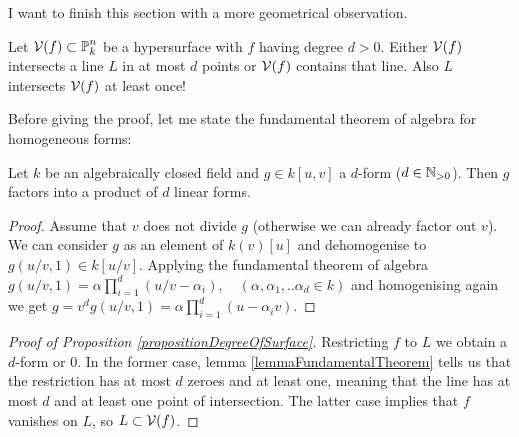 I want to finish this section with a more geometrical observation.
\begin{proposition} \label{propositionDegreeOfSurface}
Let $\operatorname{\mathcal V}(f) \subset \operatorname{\mathbb P}^n_k$ be a hypersurface with $f$ having degree $d> 0$.
Either $\operatorname{\mathcal V}(f)$ intersects a line $L$ in at most $d$ points or $\operatorname{\mathcal V}(f)$ contains that line.
Also $L$ intersects $\operatorname{\mathcal V}(f)$ at least once!
\end{proposition}

Before giving the proof, let me state the fundamental theorem of algebra for homogeneous forms:

\begin{lemma} \label{lemmaFundamentalTheorem}
Let $k$ be an algebraically closed field and $g \in k[u,v]$ a $d$-form ($d \in \operatorname{\mathbb N_{>0}}$).
Then $g$ factors into a product of $d$ linear forms.
\end{lemma}
\begin{proof}
Assume that $v$ does not divide $g$ (otherwise we can already factor out $v$).
We can consider $g$ as an element of $k(v)[u]$ and dehomogenise to $g(u/v,1) \in k[u/v]$.
Applying the fundamental theorem of algebra $g(u/v,1) = \alpha\prod_{i=1}^d(u/v - \alpha_i), \quad (\alpha,\alpha_1,..\alpha_d \in k)$ and homogenising again we get
$g = v^d g(u/v,1) = \alpha\prod_{i=1}^d(u - \alpha_iv)$.
\end{proof}

\begin{proof}[Proof of Proposition \ref{propositionDegreeOfSurface}]
Restricting $f$ to $L$ we obtain a $d$-form or 0.
In the former case, lemma \ref{lemmaFundamentalTheorem} tells us that the restriction has at most $d$ zeroes and at least one, meaning that the line has at most $d$ and at least one point of intersection.
The latter case implies that $f$ vanishes on $L$, so $L \subset \operatorname{\mathcal V}(f)$.
\end{proof}
